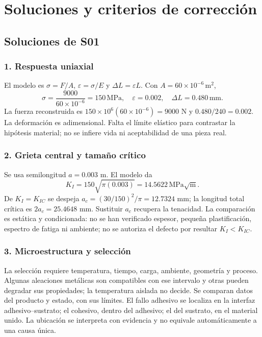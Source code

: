 



\part{Soluciones y criterios de corrección}
\chapter{Soluciones de S01}
\section{1. Respuesta uniaxial}
El modelo es $\sigma=F/A$, $\varepsilon=\sigma/E$ y $\Delta L=\varepsilon L$. Con $A=60\times10^{-6}\,\mathrm{m^2}$,
\[\sigma=\frac{9000}{60\times10^{-6}}=150\,\mathrm{MPa},\quad \varepsilon=0.002,\quad\Delta L=0.480\,\mathrm{mm}.\]
La fuerza reconstruida es $150\times10^6(60\times10^{-6})=9000$ N y $0.480/240=0.002$. La deformación es adimensional. Falta el límite elástico para contrastar la hipótesis material; no se infiere vida ni aceptabilidad de una pieza real.



\section{2. Grieta central y tamaño crítico}
Se usa semilongitud $ a=0.003$ m. El modelo da
\[K_I=150\sqrt{\pi(0.003)}=14.5622\,\mathrm{MPa\sqrt m}.\]
De $K_I=K_{IC}$ se despeja $ a_c=(30/150)^2/\pi=12.7324$ mm; la longitud total crítica es $2a_c=25.4648$ mm. Sustituir $ a_c $ recupera la tenacidad. La comparación es estática y condicionada: no se han verificado espesor, pequeña plastificación, espectro de fatiga ni ambiente; no se autoriza el defecto por resultar $K_I<K_{IC}$.



\section{3. Microestructura y selección}
La selección requiere temperatura, tiempo, carga, ambiente, geometría y proceso. Algunas aleaciones metálicas son compatibles con ese intervalo y otras pueden degradar sus propiedades; la temperatura aislada no decide. Se comparan datos del producto y estado, con sus límites. El fallo adhesivo se localiza en la interfaz adhesivo--sustrato; el cohesivo, dentro del adhesivo; el del sustrato, en el material unido. La ubicación se interpreta con evidencia y no equivale automáticamente a una causa única.

